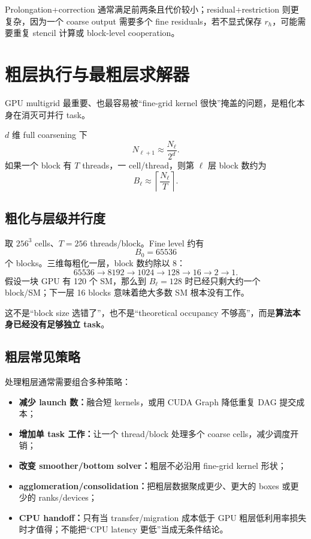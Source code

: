 Prolongation+correction 通常满足前两条且代价较小；residual+restriction 则更复杂，因为一个 coarse output 需要多个 fine residuals，若不显式保存 $r_h$，可能需要重复 stencil 计算或 block-level cooperation。

\section{粗层执行与最粗层求解器}
\label{sec:gpu-coarse-collapse}

GPU multigrid 最重要、也最容易被“fine-grid kernel 很快”掩盖的问题，是粗化本身在消灭可并行 task。

$d$ 维 full coarsening 下
\begin{equation}
N_{\ell+1}\approx\frac{N_\ell}{2^d}.
\end{equation}
如果一个 block 有 $T$ threads，一 cell/thread，则第 $\ell$ 层 block 数约为
\begin{equation}
B_\ell\approx\left\lceil\frac{N_\ell}{T}\right\rceil.
\label{eq:gpu-block-count-per-level}
\end{equation}

\subsection{粗化与层级并行度}

取 $256^3$ cells、$T=256$ threads/block。Fine level 约有
\[
B_0=65536
\]
个 blocks。三维每粗化一层，block 数约除以 8：
\[
65536\rightarrow8192\rightarrow1024\rightarrow128\rightarrow16\rightarrow2\rightarrow1.
\]
假设一块 GPU 有 120 个 SM，那么到 $B_\ell=128$ 时已经只剩大约一个 block/SM；下一层 16 blocks 意味着绝大多数 SM 根本没有工作。

这不是“block size 选错了”，也不是“theoretical occupancy 不够高”，而是\textbf{算法本身已经没有足够独立 task}。

\subsection{粗层常见策略}

处理粗层通常需要组合多种策略：

\begin{itemize}
\item \textbf{减少 launch 数：}融合短 kernels，或用 CUDA Graph 降低重复 DAG 提交成本；
\item \textbf{增加单 task 工作：}让一个 thread/block 处理多个 coarse cells，减少调度开销；
\item \textbf{改变 smoother/bottom solver：}粗层不必沿用 fine-grid kernel 形状；
\item \textbf{agglomeration/consolidation：}把粗层数据聚成更少、更大的 boxes 或更少的 ranks/devices；
\item \textbf{CPU handoff：}只有当 transfer/migration 成本低于 GPU 粗层低利用率损失时才值得；不能把“CPU latency 更低”当成无条件结论。
\end{itemize}

